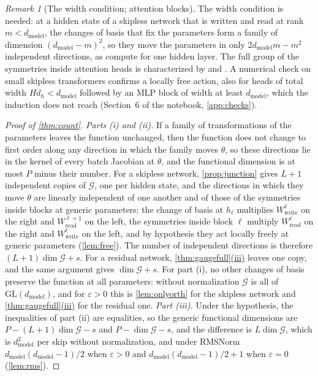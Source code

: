 \documentclass[10pt]{article}
\theoremstyle{definition}
\theoremstyle{remark}
\newtheorem{remark}[theorem]{Remark}
\newcommand{\Wread}{W_{\mathrm{read}}}
\newcommand{\Wwrite}{W_{\mathrm{write}}}
\newcommand{\dm}{d_{\mathrm{model}}}
\newcommand{\GL}{\mathrm{GL}}
\newcommand{\G}{\mathcal{G}}
\DeclareRobustCommand{\cpref}[2]{\hyperref[#1:#2]{\cref*{#1}(#2)}}
\begin{document}
\begin{remark}[The width condition; attention blocks]\label{rem:attnfree}
The width condition is needed: at a hidden state of a skipless network that is written and read at rank $m < \dm$, the changes of basis that fix the parameters form a family of dimension $(\dm-m)^2$, so they move the parameters in only $2\dm m - m^2$ independent directions, as \citet[Proposition~C.3]{zhao2023symmetries} compute for one hidden layer. The full group of the symmetries inside attention heads is characterized by \citet{tran2025equivariant} and \citet{wang2025gauge}. A numerical check on small skipless transformers confirms a locally free action, also for heads of total width $Hd_h < \dm$ followed by an MLP block of width at least $\dm$, which the induction does not reach (Section~6 of the notebook, \cref{app:checks}).
\end{remark}

\begin{proof}[Proof of \cref{thm:count}]
\emph{Parts (i) and (ii).} If a family of transformations of the parameters leaves the function unchanged, then the function does not change to first order along any direction in which the family moves $\theta$, so these directions lie in the kernel of every batch Jacobian at $\theta$, and the functional dimension is at most $P$ minus their number. For a skipless network, \cref{prop:junction} gives $L+1$ independent copies of $\G$, one per hidden state, and the directions in which they move $\theta$ are linearly independent of one another and of those of the symmetries inside blocks at generic parameters: the change of basis at $h_{\ell}$ multiplies $\Wwrite^{\ell}$ on the right and $\Wread^{\ell+1}$ on the left, the symmetries inside block $\ell$ multiply $\Wread^{\ell}$ on the right and $\Wwrite^{\ell}$ on the left, and by hypothesis they act locally freely at generic parameters (\cref{lem:free}). The number of independent directions is therefore $(L+1)\dim\G + s$. For a residual network, \cpref{thm:gaugefull}{iii} leaves one copy, and the same argument gives $\dim\G + s$. For part (i), no other changes of basis preserve the function at all parameters: without normalization $\G$ is all of $\GL(\dm)$, and for $\varepsilon > 0$ this is \cref{lem:onlyorth} for the skipless network and \cpref{thm:gaugefull}{iii} for the residual one.
\emph{Part (iii).} Under the hypothesis, the inequalities of part (ii) are equalities, so the generic functional dimensions are $P - (L+1)\dim\G - s$ and $P - \dim\G - s$, and the difference is $L\dim\G$, which is $\dm^2$ per skip without normalization, and under RMSNorm $\dm(\dm-1)/2$ when $\varepsilon > 0$ and $\dm(\dm-1)/2 + 1$ when $\varepsilon = 0$ (\cref{lem:rms}).
\end{proof}
\end{document}
